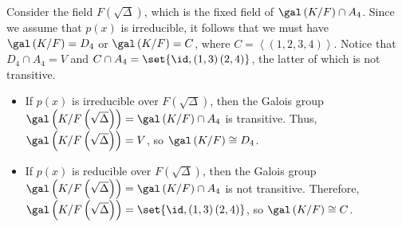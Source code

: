 \documentclass[10pt]{mypackage}
\begin{document}
\begin{itemize}
\begin{itemize}
\begin{itemize}
            Consider the field $F\left( \sqrt{\Delta} \right)$, which is the fixed field of $\gal\left( K/F \right)\cap A_4$. Since we assume that $p(x)$ is irreducible, it follows that we must have $\gal\left( K/F \right) = D_4$ or $\gal\left( K/F \right) = C$, where $C = \left\langle \left( 1,2,3,4 \right) \right\rangle$. Notice that $D_4\cap A_4 = V$ and $C\cap A_4 = \set{\id, \left( 1,3 \right)\left( 2,4 \right)}$, the latter of which is not transitive.
          \begin{itemize}
            \item If $p(x)$ is irreducible over $F\left( \sqrt{\Delta} \right)$, then the Galois group $\gal\left( K/F\left( \sqrt{\Delta} \right) \right) = \gal\left( K/F \right)\cap A_4$ is transitive. Thus, $\gal\left( K/F\left( \sqrt{\Delta} \right) \right) = V$, so $\gal\left( K/F \right) \cong D_4$.
            \item If $p(x)$ is reducible over $F\left( \sqrt{\Delta} \right)$, then the Galois group $\gal\left( K/F\left( \sqrt{\Delta} \right) \right) = \gal\left( K/F \right)\cap A_4$ is not transitive. Therefore, $\gal\left( K/F\left( \sqrt{\Delta} \right) \right) = \set{\id, \left( 1,3 \right)\left( 2,4 \right)}$, so $\gal\left( K/F \right)\cong C$.
          \end{itemize}
        \end{itemize}
    \end{itemize}
\end{itemize}
\end{document}
